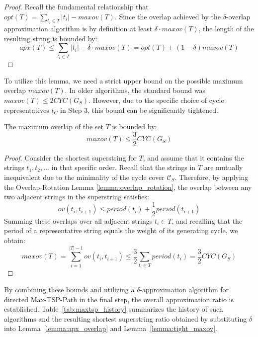 \begin{proof}
Recall the fundamental relationship that $opt(T) = \sum_{t_i \in T} |t_i| -
\textit{maxov}(T)$. Since the overlap achieved by the $\delta$-overlap
approximation algorithm is by definition at least $\delta \cdot
\textit{maxov}(T)$, the length of the resulting string is bounded by:
\begin{equation}
apx(T) \le \sum_{t_i \in T} |t_i| - \delta \cdot \textit{maxov}(T) = opt(T) + (1 - \delta)\textit{maxov}(T)
\end{equation}
\end{proof}

To utilize this lemma, we need a strict upper bound on the possible maximum
overlap $\textit{maxov}(T)$. In older algorithms, the standard bound was
$\textit{maxov}(T) \le 2 CYC(G_S)$. However, due to the specific choice of cycle
representatives $t_C$ in Step 3, this bound can be significantly tightened.

\begin{lemma} \label{lemma:tight_maxov}
The maximum overlap of the set $T$ is bounded by:
\begin{equation}
\textit{maxov}(T) \le \frac{3}{2} CYC(G_S)
\end{equation}
\end{lemma}

\begin{proof}
Consider the shortest superstring for $T$, and assume that it contains the
strings $t_1, t_2, \dots$ in that specific order. Recall that the strings in $T$
are mutually inequivalent due to the minimality of the cycle cover
$\mathcal{C}_S$. Therefore, by applying the Overlap-Rotation Lemma
\ref{lemma:overlap_rotation}, the overlap between any two adjacent strings in
the superstring satisfies:
\begin{equation}
ov(t_i, t_{i+1}) \le \textit{period}(t_i) + \frac{1}{2}\textit{period}(t_{i+1})
\end{equation}
Summing these overlaps over all adjacent strings $t_i \in T$, and recalling that
the period of a representative string equals the weight of its generating cycle,
we obtain:
\begin{equation}
\textit{maxov}(T) = \sum_{i=1}^{|T|-1} ov(t_i, t_{i+1}) \le \frac{3}{2} \sum_{t_i \in T} \textit{period}(t_i) = \frac{3}{2} CYC(G_S)
\end{equation}
\end{proof}

By combining these bounds and utilizing a $\delta$-approximation algorithm for
directed Max-TSP-Path in the final step, the overall approximation ratio is
established. Table~\ref{tab:maxtsp_history} summarizes the history of such
algorithms and the resulting shortest superstring ratio obtained by substituting
$\delta$ into Lemma~\ref{lemma:apx_overlap} and Lemma~\ref{lemma:tight_maxov}.

